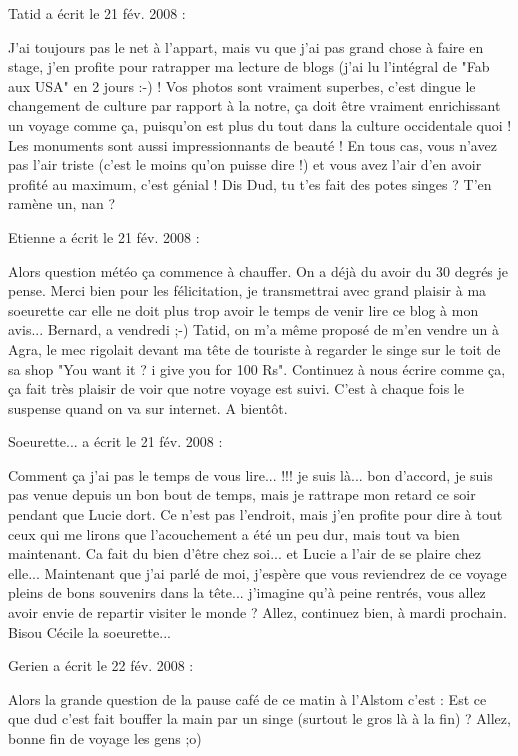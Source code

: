 \medskip
Tatid a écrit le 21 fév. 2008 :
\begin{displayquote}
J'ai toujours pas le net à l'appart, mais vu que j'ai pas grand chose à faire en stage, j'en profite pour ratrapper ma lecture de blogs (j'ai lu l'intégral de "Fab aux USA" en 2 jours :-) !
Vos photos sont vraiment superbes, c'est dingue le changement de culture par rapport à la notre, ça doit être vraiment enrichissant un voyage comme ça, puisqu'on est plus du tout dans la culture occidentale quoi ! Les monuments sont aussi impressionnants de beauté ! En tous cas, vous n'avez pas l'air triste (c'est le moins qu'on puisse dire !) et vous avez l'air d'en avoir profité au maximum, c'est génial !
Dis Dud, tu t'es fait des potes singes ? T'en ramène un, nan ?
\end{displayquote}

\medskip
Etienne a écrit le 21 fév. 2008 :
\begin{displayquote}
Alors question météo ça commence à chauffer. On a déjà du avoir du 30 degrés je pense. Merci bien pour les félicitation, je transmettrai avec grand plaisir à ma soeurette car elle ne doit plus trop avoir le temps de venir lire ce blog à mon avis...
Bernard, a vendredi ;-)
Tatid, on m'a même proposé de m'en vendre un à Agra, le mec rigolait devant ma tête de touriste à regarder le singe sur le toit de sa shop "You want it ? i give you for 100 Rs".
Continuez à nous écrire comme ça, ça fait très plaisir de voir que notre voyage est suivi. C'est à chaque fois le suspense quand on va sur internet. A bientôt.
\end{displayquote}

\medskip
Soeurette... a écrit le 21 fév. 2008 :
\begin{displayquote}
Comment ça j'ai pas le temps de vous lire... !!! je suis là... bon d'accord, je suis pas venue depuis un bon bout de temps, mais je rattrape mon retard ce soir pendant que Lucie dort.
Ce n'est pas l'endroit, mais j'en profite pour dire à tout ceux  qui me lirons que l'acouchement a été un peu dur, mais tout va bien maintenant. Ca fait du bien d'être chez soi... et Lucie a l'air de se plaire chez elle...
Maintenant que j'ai parlé de moi, j'espère que vous reviendrez de ce voyage pleins de bons souvenirs dans la tête... j'imagine qu'à peine rentrés, vous allez avoir envie de repartir visiter le monde ?
Allez, continuez bien, à mardi prochain.
Bisou
Cécile la soeurette...
\end{displayquote}

\medskip
Gerien a écrit le 22 fév. 2008 :
\begin{displayquote}
Alors la grande question de la pause café de ce matin à l'Alstom c'est :
Est ce que dud c'est fait bouffer la main par un singe (surtout le gros là à la fin) ?
Allez, bonne fin de voyage les gens ;o)
\end{displayquote}

